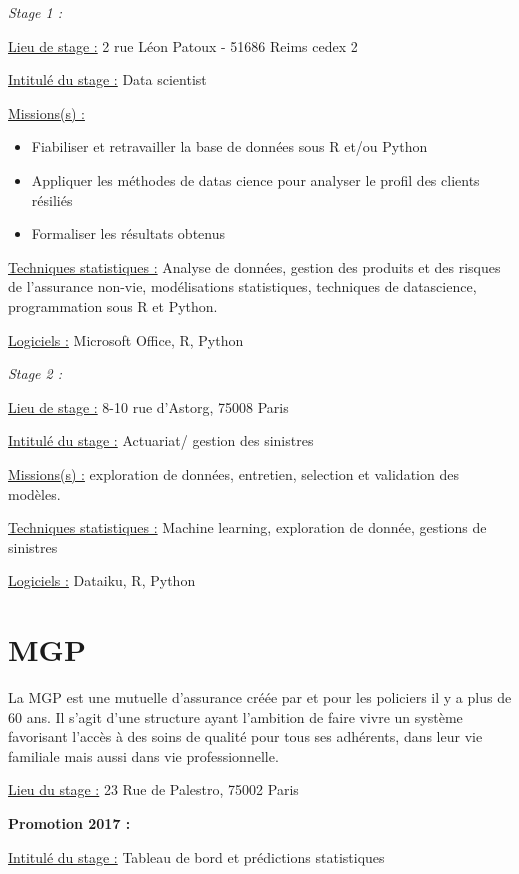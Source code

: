 \documentclass[
  letterpaper,
  DIV=11,
  numbers=noendperiod]{scrreprt}
\begin{document}
\emph{Stage 1 :}

\uline{Lieu de stage :} 2 rue Léon Patoux - 51686 Reims cedex 2

\uline{Intitulé du stage :} Data scientist

\uline{Missions(s) :}

\begin{itemize}
\item
  Fiabiliser et retravailler la base de données sous R et/ou Python
\item
  Appliquer les méthodes de datas cience pour analyser le profil des
  clients résiliés
\item
  Formaliser les résultats obtenus
\end{itemize}

\uline{Techniques statistiques :} Analyse de données, gestion des
produits et des risques de l'assurance non-vie, modélisations
statistiques, techniques de datascience, programmation sous R et Python.

\uline{Logiciels :} Microsoft Office, R, Python

\emph{Stage 2 :}

\uline{Lieu de stage :} 8-10 rue d'Astorg, 75008 Paris

\uline{Intitulé du stage :} Actuariat/ gestion des sinistres

\uline{Missions(s) :} exploration de données, entretien, selection et
validation des modèles.

\uline{Techniques statistiques :} Machine learning, exploration de
donnée, gestions de sinistres

\uline{Logiciels :} Dataiku, R, Python

\hypertarget{mgp}{%
\section{\texorpdfstring{\textbf{MGP}}{MGP}}\label{mgp}}

La MGP est une mutuelle d'assurance créée par et pour les policiers il y
a plus de 60 ans. Il s'agit d'une structure ayant l'ambition de faire
vivre un système favorisant l'accès à des soins de qualité pour tous ses
adhérents, dans leur vie familiale mais aussi dans vie professionnelle.

\uline{Lieu du stage :} 23 Rue de Palestro, 75002 Paris

\textbf{Promotion 2017 :}

\uline{Intitulé du stage :} Tableau de bord et prédictions statistiques
\end{document}

